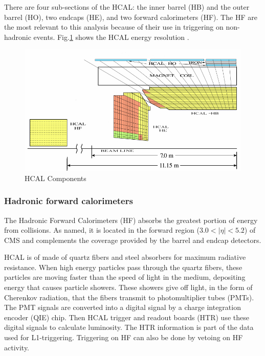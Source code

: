 There are four sub-sections of the HCAL: the inner barrel (HB) and the outer barrel (HO), two endcaps (HE), and two forward calorimeters (HF). The HF are the most relevant to this analysis because of their use in triggering on non-hadronic events. Fig.\ref{fig:hcalComp} shows the HCAL energy resolution \cite{Bayatian:2006nff}.

\begin{figure}[h!]
\begin{centering}
\includegraphics[width=5in]{Chapter3/importfigs/filtering_noise_in_CMS_hadron_calorimeter.png}
\par\end{centering}
\caption{HCAL Components \cite{Bayatian:2006nff} \label{fig:hcalComp}}
\end{figure}


\subsubsection{Hadronic forward calorimeters}

The Hadronic Forward Calorimeters (HF) absorbs the greatest portion of energy from collisions. As named, it is located in the forward region ($3.0<|\eta| < 5.2 $) of CMS and complements the coverage provided by the barrel and endcap detectors.

HCAL is of made of quartz fibers and steel absorbers for maximum radiative resistance. When high energy particles pass through the quartz fibers, these particles are moving faster than the speed of light in the medium, depositing energy that causes particle showers. These showers give off light, in the form of Cherenkov radiation, that the fibers transmit to photomultiplier tubes (PMTs). The PMT signals are converted into a digital signal by a charge integration encoder (QIE) chip. Then HCAL trigger and readout boards (HTR) use these digital signals to calculate luminosity. The HTR information is part of the data used for L1-triggering. Triggering on HF can also be done by vetoing on HF activity. 

